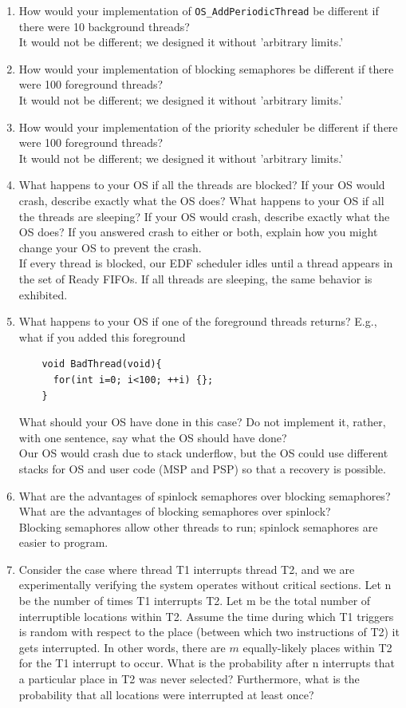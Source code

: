 \documentclass[12pt]{article}
\begin{document}
\begin{enumerate}[1)]
\item How would your implementation of \verb|OS_AddPeriodicThread| be
  different if there were 10 background threads? \\
  It would not be different; we designed it without 'arbitrary limits.'
\item How would your implementation of blocking semaphores be
  different if there were 100 foreground threads? \\
  It would not be different; we designed it without 'arbitrary limits.'
\item How would your implementation of the priority scheduler be
  different if there were 100 foreground threads? \\
  It would not be different; we designed it without 'arbitrary limits.'
\item What happens to your OS if all the threads are blocked? If your
  OS would crash, describe exactly what the OS does? What happens to
  your OS if all the threads are sleeping? If your OS would crash,
  describe exactly what the OS does? If you answered crash to either
  or both, explain how you might change your OS to prevent the crash. \\
  If every thread is blocked, our EDF scheduler idles until a thread
  appears in the set of Ready FIFOs. If all threads are sleeping, the
  same behavior is exhibited.
\item What happens to your OS if one of the foreground threads
  returns? E.g., what if you added this foreground
  \begin{verbatim}
    void BadThread(void){
      for(int i=0; i<100; ++i) {};
    }
  \end{verbatim}
  What should your OS have done in this case? Do not implement it,
  rather, with one sentence, say what the OS should have done? \\
  Our OS would crash due to stack underflow, but the OS could use
  different stacks for OS and user code (MSP and PSP) so that a
  recovery is possible.
\item What are the advantages of spinlock semaphores over blocking
  semaphores? What are the advantages of blocking semaphores over
  spinlock? \\
  Blocking semaphores allow other threads to run; spinlock semaphores
  are easier to program.
\item Consider the case where thread T1 interrupts thread T2, and we
  are experimentally verifying the system operates without critical
  sections. Let n be the number of times T1 interrupts T2. Let m be
  the total number of interruptible locations within T2. Assume the
  time during which T1 triggers is random with respect to the place
  (between which two instructions of T2) it gets interrupted. In other
  words, there are $m$ equally-likely places within T2 for the T1
  interrupt to occur. What is the probability after n interrupts that
  a particular place in T2 was never selected? Furthermore, what is
  the probability that all locations were interrupted at least once?
\end{enumerate}
\end{document}

